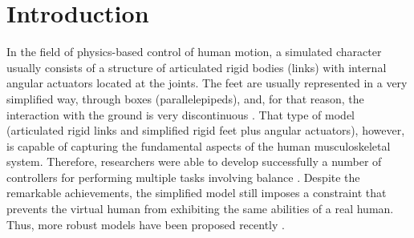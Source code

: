 \documentclass[tog]{acmsiggraph}
\begin{document}
\begin{abstract}

\end{abstract}


\keywordlist


\copyrightspace

\section{Introduction}

In the field of physics-based control of human motion, a simulated character usually consists of a structure of articulated rigid bodies (links)
with internal angular actuators located at the joints. The feet are usually represented in a very simplified way, through boxes (parallelepipeds),
and, for that reason, the interaction with the ground is very discontinuous \cite{bib:Lee10,bib:Jain11}. That type of model (articulated rigid
links and simplified rigid feet plus angular actuators), however, is capable of capturing the fundamental aspects of the human musculoskeletal
system. Therefore, researchers were able to develop successfully a number of controllers for performing multiple tasks involving balance \cite{bib:Geijtenbeek13}. 
Despite the remarkable achievements, the simplified model still imposes a constraint that prevents the virtual human from exhibiting the same
abilities of a real human. Thus, more robust models have been proposed recently \cite{bib:Jain11,bib:Wang12}.
\end{document}

